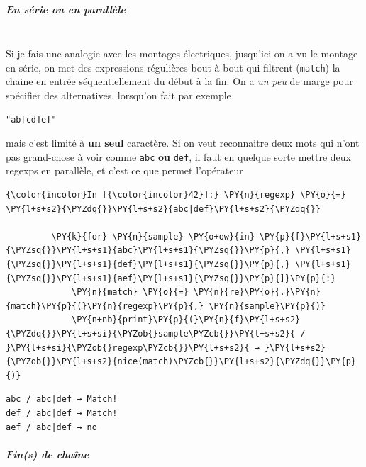     \hypertarget{en-suxe9rie-ou-en-paralluxe8le}{%
\subparagraph{En série ou en
parallèle\\\\}\label{en-suxe9rie-ou-en-paralluxe8le}}

    Si je fais une analogie avec les montages électriques, jusqu'ici on a vu
le montage en série, on met des expressions régulières bout à bout qui
filtrent (\texttt{match}) la chaine en entrée séquentiellement du début
à la fin. On a \emph{un peu} de marge pour spécifier des alternatives,
lorsqu'on fait par exemple\\

\begin{verbatim}
"ab[cd]ef"
\end{verbatim}

mais c'est limité à \textbf{un seul} caractère. Si on veut reconnaitre
deux mots qui n'ont pas grand-chose à voir comme \texttt{abc}
\textbf{ou} \texttt{def}, il faut en quelque sorte mettre deux regexps
en parallèle, et c'est ce que permet l'opérateur \texttt{\textbar{}}

    \begin{Verbatim}[commandchars=\\\{\}]
{\color{incolor}In [{\color{incolor}42}]:} \PY{n}{regexp} \PY{o}{=} \PY{l+s+s2}{\PYZdq{}}\PY{l+s+s2}{abc|def}\PY{l+s+s2}{\PYZdq{}}
         
         \PY{k}{for} \PY{n}{sample} \PY{o+ow}{in} \PY{p}{[}\PY{l+s+s1}{\PYZsq{}}\PY{l+s+s1}{abc}\PY{l+s+s1}{\PYZsq{}}\PY{p}{,} \PY{l+s+s1}{\PYZsq{}}\PY{l+s+s1}{def}\PY{l+s+s1}{\PYZsq{}}\PY{p}{,} \PY{l+s+s1}{\PYZsq{}}\PY{l+s+s1}{aef}\PY{l+s+s1}{\PYZsq{}}\PY{p}{]}\PY{p}{:}
             \PY{n}{match} \PY{o}{=} \PY{n}{re}\PY{o}{.}\PY{n}{match}\PY{p}{(}\PY{n}{regexp}\PY{p}{,} \PY{n}{sample}\PY{p}{)}
             \PY{n+nb}{print}\PY{p}{(}\PY{n}{f}\PY{l+s+s2}{\PYZdq{}}\PY{l+s+si}{\PYZob{}sample\PYZcb{}}\PY{l+s+s2}{ / }\PY{l+s+si}{\PYZob{}regexp\PYZcb{}}\PY{l+s+s2}{ → }\PY{l+s+s2}{\PYZob{}}\PY{l+s+s2}{nice(match)\PYZcb{}}\PY{l+s+s2}{\PYZdq{}}\PY{p}{)}
\end{Verbatim}


    \begin{Verbatim}[commandchars=\\\{\}]
abc / abc|def → Match!
def / abc|def → Match!
aef / abc|def → no

    \end{Verbatim}

    \hypertarget{fins-de-chauxeene}{%
\subparagraph{Fin(s) de chaîne\\\\}\label{fins-de-chauxeene}}

